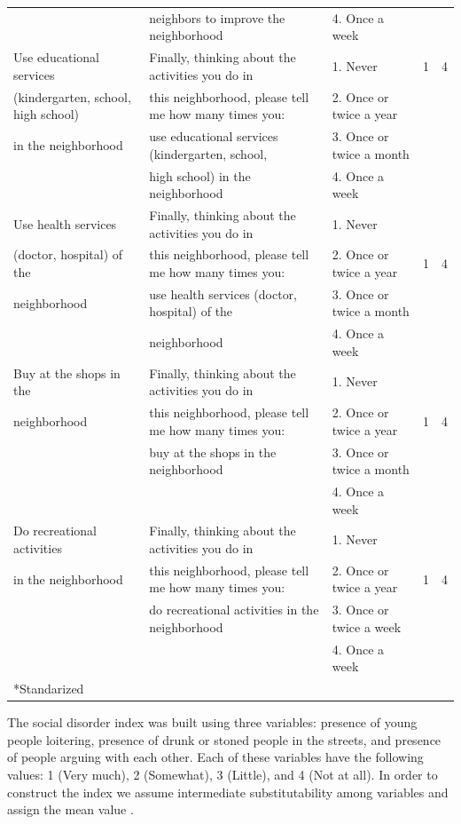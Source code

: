 \documentclass[11pt]{article}
\begin{document}
\begin{tiny}
\begin{tabular}{lllcc}
	&	neighbors to improve the neighborhood	&	4. Once a week	&		&		\\
Use educational services 	&	Finally, thinking about the activities you do in 	&	1. Never	&	1	&	4	\\
(kindergarten, school, high school)	&	this neighborhood, please tell me how many times you:	&	2. Once or twice a year	&		&		\\
 in the neighborhood	&	use educational services (kindergarten, school, 	&	3. Once or twice a month	&		&		\\
	&	high school) in the neighborhood	&	4. Once a week	&		&		\\
Use health services 	&	Finally, thinking about the activities you do in 	&	1. Never	&		&		\\
(doctor, hospital) of the	&	this neighborhood, please tell me how many times you:	&	2. Once or twice a year	&	1	&	4	\\
neighborhood	&	use health services (doctor, hospital) of the	&	3. Once or twice a month	&		&		\\
	&	neighborhood	&	4. Once a week	&		&		\\
Buy at the shops in the 	&	Finally, thinking about the activities you do in 	&	1. Never	&		&		\\
neighborhood	&	this neighborhood, please tell me how many times you:	&	2. Once or twice a year	&	1	&	4	\\
	&	buy at the shops in the neighborhood	&	3. Once or twice a month	&		&		\\
	&		&	4. Once a week	&		&		\\
Do recreational activities 	&	Finally, thinking about the activities you do in 	&	1. Never	&		&		\\
in the neighborhood	&	this neighborhood, please tell me how many times you:	&	2. Once or twice a year	&	1	&	4	\\
	&	do recreational activities in the neighborhood	&	3. Once or twice a week	&		&		\\
	&		&	4. Once a week	&		&		\\\hline
*Standarized
\end{tabular}
\end{tiny}
\restoregeometry


\newpage The social disorder index was built using three variables: presence of young people loitering, presence of drunk or stoned people in the streets, and presence of people arguing with each other. Each of these variables have the following values: 1 (Very much), 2 (Somewhat), 3 (Little), and 4 (Not at all). In order to construct the index we assume intermediate substitutability among variables and assign the mean value \citep{goertz2006social}.
\end{document}
